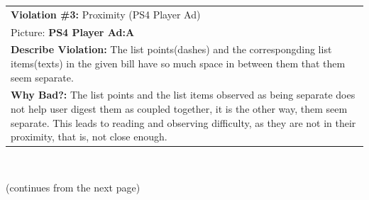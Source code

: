 \documentclass[a4paper,11pt,oneside]{scrreprt}
\begin{document}
\begin{tabularx}{\textwidth}{|X|}
	\\
	\hline	
	
		\textbf{Violation \#3:} Proximity (PS4 Player Ad)\\
		Picture: \textbf{PS4 Player Ad:A}
		
		\\
		\textbf{Describe Violation:} The list points(dashes) and the correspongding list items(texts) in the given bill have so much space in between them that them seem separate.
		
		\\
		\textbf{Why Bad?:} The list points and the list items observed as being separate does not help user digest them as coupled together, it is the other way, them seem separate. This leads to reading and observing difficulty, as they are not in their proximity, that is, not close enough.
		
		\\
		\hline	
	
	

	
\end{tabularx}\\

\begin{center}
	(continues from the next page)
	
\end{center}
\end{document}
